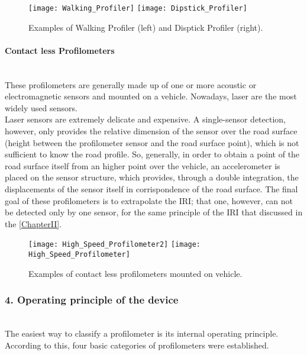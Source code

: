 \documentclass{standalone}
\begin{document}
\vspace{0.35cm}
\begin{figure}[ht]
\centering
\texttt{[image: Walking\_Profiler]}
\hspace{1.5cm}
\texttt{[image: Dipstick\_Profiler]}
\caption{Examples of Walking Profiler (left) and Disptick Profiler (right).}
\label{fig:contact_profiler}
\end{figure}
\clearpage
\paragraph{Contact less Profilometers}\leavevmode\\  \noindent These profilometers are generally made up of one or more acoustic or electromagnetic sensors and mounted on a vehicle. Nowadays, laser are the most widely used sensors.\\ Laser sensors are extremely delicate and expensive. A single-sensor detection, however, only provides the relative dimension of the sensor over the road surface (height between the profilometer sensor and the road surface point), which is not sufficient to know the road profile. So, generally, in order to obtain a point of the road surface itself from an higher point over the vehicle, an accelerometer is placed on the sensor structure, which provides, through a double integration, the displacements of the sensor itself in corrispondence of the road surface. The final goal of these profilometers is to extrapolate the IRI; that one, however, can not be detected only by one sensor, for the same principle of the IRI that discussed in the \ref{ChapterII}.

\vspace{0.35cm}
\begin{figure}[ht]
\centering
\texttt{[image: High\_Speed\_Profilometer2]}
\hspace{1cm}
\texttt{[image: High\_Speed\_Profilometer]}
\caption{Examples of contact less profilometers mounted on vehicle.}
\label{fig:contact_less_profiler}
\end{figure}



\subsubsection{4. Operating principle of the device}\leavevmode\\
The easiest way to classify a profilometer is its internal operating principle.\\ According to this, four basic categories of profilometers were established\cite{measuring_equipment}.
\end{document}
